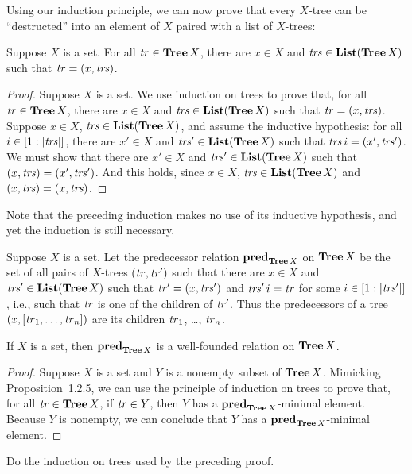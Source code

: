 Using our induction principle, we can now prove that every $X$-tree
can be ``destructed'' into an element of $X$ paired with a list of
$X$-trees:

\begin{proposition}
\label{TreeDestruct}
Suppose $X$ is a set.  For all ${\it tr}\in\mathbf{Tree}\,X$, there are $x\in X$
and ${\it trs}\in\mathbf{List}(\mathbf{Tree}\,X)$ such that ${\it tr} = (x, {\it trs})$.
\end{proposition}

\begin{proof}
Suppose $X$ is a set.  We use induction on trees to prove that, for
all ${\it tr}\in\mathbf{Tree}\,X$, there are $x\in X$ and ${\it trs}\in\mathbf{List}(\mathbf{Tree}\,X)$
such that ${\it tr} = (x, {\it trs})$.  Suppose $x\in X$,
${\it trs}\in\mathbf{List}(\mathbf{Tree}\,X)$, and assume the inductive hypothesis: for all
$i\in[1:|{\it trs}|]$, there are $x'\in X$ and ${\it trs}'\in\mathbf{List}(\mathbf{Tree}\,X)$
such that ${\it trs}\,i = (x', {\it trs}')$. We must show that there are $x'\in
X$ and ${\it trs}'\in\mathbf{List}(\mathbf{Tree}\,X)$ such that $(x,{\it trs}) =
(x',{\it trs}')$. And this holds, since $x\in X$, ${\it trs}\in\mathbf{List}(\mathbf{Tree}\,X)$
and $(x, {\it trs}) = (x, {\it trs})$.
\end{proof}

Note that the preceding induction makes no use of its inductive
hypothesis, and yet the induction is still necessary.

Suppose $X$ is a set.  Let the predecessor relation $\mathrel{\mathbf{pred}}_{\mathbf{Tree}\,X}$
on $\mathbf{Tree}\,X$ be the set of all pairs of $X$-trees $({\it tr},{\it tr}')$ such
that there are $x\in X$ and ${\it trs}'\in\mathbf{List}(\mathbf{Tree}\,X)$ such that
${\it tr}'=(x,{\it trs}')$ and ${\it trs}'\,i={\it tr}$ for some $i\in[1:|{\it trs}'|]$,
i.e., such that ${\it tr}$ is one of the children of ${\it tr}'$.
Thus the predecessors of a tree
$(x,[{\it tr}_1,\ldots,{\it tr}_n])$ are its children ${\it tr}_1$, \ldots, ${\it tr}_n$.

\begin{proposition}
If $X$ is a set, then $\mathrel{\mathbf{pred}}_{\mathbf{Tree}\,X}$ is a well-founded relation
on $\mathbf{Tree}\,X$.
\end{proposition}

\begin{proof}
Suppose $X$ is a set and $Y$ is a nonempty subset of $\mathbf{Tree}\,X$.
Mimicking Proposition~1.2.5, we can use the principle of induction
on trees to prove that, for all ${\it tr}\in\mathbf{Tree}\,X$, if ${\it tr}\in Y$,
then $Y$ has a $\mathrel{\mathbf{pred}}_{\mathbf{Tree}\,X}$-minimal element.  Because $Y$
is nonempty, we can conclude that $Y$ has a
$\mathrel{\mathbf{pred}}_{\mathbf{Tree}\,X}$-minimal element.
\end{proof}

\begin{exercise}
Do the induction on trees used by the preceding proof.
\end{exercise}

